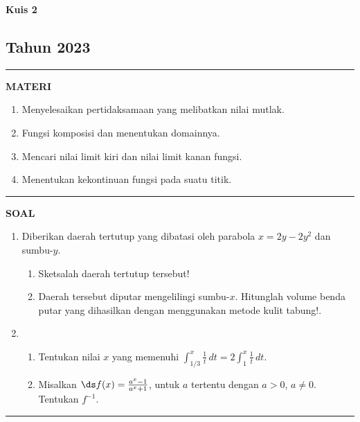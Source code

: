 \begin{flushright}
    \textbf{\Large{Kuis 2}}
    \subsection*{Tahun 2023}
\end{flushright}
\vspace{0.5cm}
\hrule height 2pt
\vspace{0.5cm}
\begin{center}
    \textbf{\large{MATERI}}
    \begin{enumerate}[leftmargin=*, label={\arabic*}.]
        \item Menyelesaikan pertidaksamaan yang melibatkan nilai mutlak.
        \item Fungsi komposisi dan menentukan domainnya.
        \item Mencari nilai limit kiri dan nilai limit kanan fungsi.
        \item Menentukan kekontinuan fungsi pada suatu titik.
    \end{enumerate}
\end{center}
\vspace{0.2cm}
\hrule height 1pt
\vspace{0.5cm}
\begin{center}
    \textbf{\large{SOAL}}
\end{center}
\begin{enumerate}[leftmargin=*, label={\arabic*}.]
\item Diberikan daerah tertutup yang dibatasi oleh parabola $x=2y-2y^{2}$ 
dan sumbu-$y$.
\begin{enumerate}[label={\alph*}.]
    \item Sketsalah daerah tertutup tersebut!
    \item Daerah tersebut diputar mengelilingi sumbu-$x$. Hitunglah volume 
    benda putar yang dihasilkan dengan menggunakan metode kulit tabung!.
\end{enumerate}
\item \begin{enumerate}[label={\alph*}.]
    \item Tentukan nilai $x$ yang memenuhi 
    $\int_{1/3}^{x}\frac{1}{t}\,dt=2\int_{1}^{x}\frac{1}{t}\,dt$.
    \item Misalkan $\ds f(x)=\frac{a^{x}-1}{a^{x}+1}$, untuk $a$ tertentu dengan $a > 0$, $a\neq 0$.
    Tentukan $f^{-1}$.
\end{enumerate}
\end{enumerate}
\vspace{0.2cm}
\hrule height 1pt
\vspace{0.5cm}

